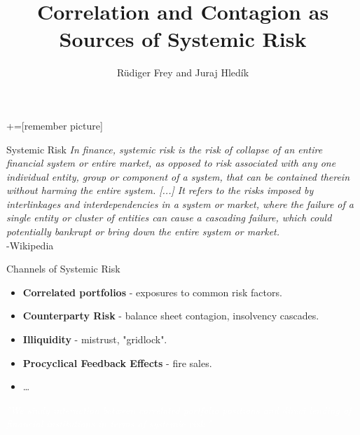 \documentclass{beamer}
\author{Rüdiger Frey and Juraj Hledík}                               %
\title[Correlation and Contagion]{Correlation and Contagion as Sources of Systemic Risk}            %
\begin{document}
+=[remember picture]
\everymath{\displaystyle}
\maketitle


\begin{frame}{Systemic Risk}
	\textit{In finance, systemic risk is the risk of collapse of an entire financial system or entire market, as opposed to risk associated with any one individual entity, group or component of a system, that can be contained therein without harming the entire system. [...] It refers to the risks imposed by interlinkages and interdependencies in a system or market, where the failure of a single entity or cluster of entities can cause a cascading failure, which could potentially bankrupt or bring down the entire system or market.}\\
	\hfill -Wikipedia
\end{frame}

\begin{frame}{Channels of Systemic Risk}
	\begin{itemize}
		\item \textbf{Correlated portfolios} - exposures to common risk factors.
		\item \textbf{Counterparty Risk} - balance sheet contagion, insolvency cascades. 
		\item \textbf{Illiquidity} - mistrust, "gridlock".
		\item \textbf{Procyclical Feedback Effects} - fire sales.
		\item \ldots
	\end{itemize}
		\textcolor{white}{\textit{"We study interaction between correlated portfolio positions and direct lending of financial institutions in terms of systemic risk."
			}}
\end{frame}
\end{document}
